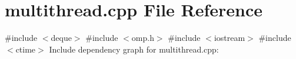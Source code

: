 \section{multithread.\+cpp File Reference}
\label{multithread_8cpp}
{\ttfamily \#include $<$deque$>$}\newline
{\ttfamily \#include $<$omp.\+h$>$}\newline
{\ttfamily \#include $<$iostream$>$}\newline
{\ttfamily \#include $<$ctime$>$}\newline
Include dependency graph for multithread.\+cpp\+:
